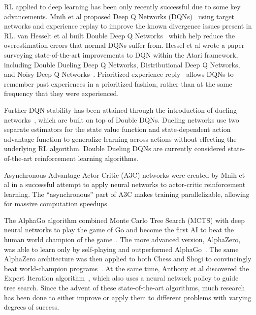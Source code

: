 \documentclass[letterpaper]{article} %
\begin{document}
RL applied to deep learning has been only recently successful due to some key advancements.
Mnih et al proposed Deep Q Networks (DQNs)~\cite{mnih2015human} using target networks and experience replay to improve the known divergence issues present in RL.
van Hesselt et al built Double Deep Q Networks~\cite{van2016deep} which help reduce the overestimation errors that normal DQNs suffer from. Hessel et al wrote a paper surveying state-of-the-art improvements to DQN within the Atari framework, including Double Dueling Deep Q Networks, Distributional Deep Q Networks, and Noisy Deep Q Networks~\cite{hessel2017rainbow}.
Prioritized experience reply~\cite{schaul2015prioritized} allows DQNs to remember past experiences in a prioritized fashion, rather than at the same frequency that they were experienced.

Further DQN stability has been attained through the introduction of dueling networks~\cite{wang2016dueling}, which are built on top of Double DQNs. Dueling networks use two separate estimators for the state value function and state-dependent action advantage function to generalize learning across actions without effecting the underlying RL algorithm. Double Dueling DQNs are currently considered state-of-the-art reinforcement learning algorithms.

Asynchronous Advantage Actor Critic (A3C) networks were created by Mnih et al in a successful attempt to apply neural networks to actor-critic reinforcement learning. The ``asynchronous'' part of A3C makes training parallelizable, allowing for massive computation speedups.

The AlphaGo algorithm combined Monte Carlo Tree Search (MCTS) with deep neural networks to play the game of Go and become the first AI to beat the human world champion of the game~\cite{silver2016mastering}.
The more advanced version, AlphaZero, was able to learn only by self-playing and outperformed AlphaGo~\cite{silver2017mastering}. The same AlphaZero architecture was then applied to both Chess and Shogi to convincingly beat world-champion programs~\cite{silver2017masteringchess}.
At the same time, Anthony et al discovered the Expert Iteration algorithm~\cite{anthony2017thinking}, which also uses a neural network policy to guide tree search. Since the advent of these state-of-the-art algorithms, much research has been done to either improve or apply them to different problems with varying degrees of success.
\end{document}
